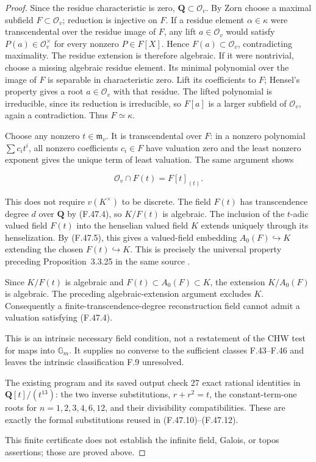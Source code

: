 \begin{proof}
Since the residue characteristic is zero, \(\mathbf Q\subset\mathcal O_v\). By Zorn choose a maximal subfield \(F\subset\mathcal O_v\); reduction is injective on \(F\). If a residue element \(\alpha\in\kappa\) were transcendental over the residue image of \(F\), any lift \(a\in\mathcal O_v\) would satisfy \(P(a)\in\mathcal O_v^\times\) for every nonzero \(P\in F[X]\). Hence \(F(a)\subset\mathcal O_v\), contradicting maximality. The residue extension is therefore algebraic. If it were nontrivial, choose a missing algebraic residue element. Its minimal polynomial over the image of \(F\) is separable in characteristic zero. Lift its coefficients to \(F\); Hensel's property gives a root \(a\in\mathcal O_v\) with that residue. The lifted polynomial is irreducible, since its reduction is irreducible, so \(F[a]\) is a larger subfield of \(\mathcal O_v\), again a contradiction. Thus \(F\simeq\kappa\).

Choose any nonzero \(t\in\mathfrak m_v\). It is transcendental over \(F\): in a nonzero polynomial \(\sum c_i t^i\), all nonzero coefficients \(c_i\in F\) have valuation zero and the least nonzero exponent gives the unique term of least valuation. The same argument shows

\[
                 \mathcal O_v\cap F(t)=F[t]_{(t)}.
 \tag{F.47.13}
\]

This does not require \(v(K^\times)\) to be discrete. The field \(F(t)\) has transcendence degree \(d\) over \(\mathbf Q\) by (F.47.4), so \(K/F(t)\) is algebraic. The inclusion of the $t$-adic valued field \(F(t)\) into the henselian valued field \(K\) extends uniquely through its henselization. By (F.47.5), this gives a valued-field embedding \(A_0(F)\hookrightarrow K\) extending the chosen \(F(t)\hookrightarrow K\). This is precisely the universal property preceding Proposition~3.3.25 in the same source \citep[author-PDF p.~125]{F_ADH2017}.

Since \(K/F(t)\) is algebraic and \(F(t)\subset A_0(F)\subset K\), the extension \(K/A_0(F)\) is algebraic. The preceding algebraic-extension argument excludes \(K\). Consequently a finite-transcendence-degree reconstruction field cannot admit a valuation satisfying (F.47.4).

This is an intrinsic necessary field condition, not a restatement of the CHW test for maps into \(\mathbb G_m\). It supplies no converse to the sufficient classes F.43–F.46 and leaves the intrinsic classification F.9 unresolved.

The existing program  and its saved output  check 27 exact rational identities in \(\mathbf Q[t]/(t^{13})\): the two inverse substitutions, \(r+r^2=t\), the constant-term-one roots for \(n=1,2,3,4,6,12\), and their divisibility compatibilities. These are exactly the formal substitutions reused in (F.47.10)–(F.47.12).

This finite certificate does not establish the infinite field, Galois, or topos assertions; those are proved above. 
\end{proof}
